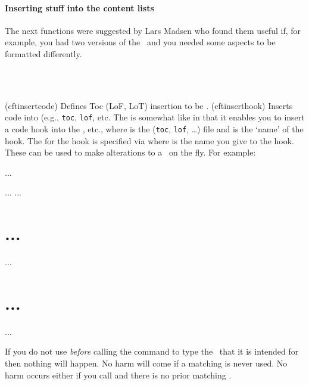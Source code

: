 \subsubsection{Inserting stuff into the content lists}
\label{sec:inserting-stuff-into}


The next functions were suggested by Lars Madsen who
found them useful if, for example, you had two versions of the
\toc\ and you needed some aspects to be formatted differently.
\begin{syntax}
\cmd{\cftinsertcode} \\
\cmd{\cftinserthook} \\
\end{syntax}
\glossary(cftinsertcode)
  {}%
  {Defines Toc (LoF, LoT)  insertion to be .}
\glossary(cftinserthook)
  {}%
  {Inserts code  into  (e.g., \texttt{toc}, \texttt{lof}, etc.}
The \cmd{\cftinserthook} is somewhat like \cmd{\addtocontents} in that it 
enables you to insert a code hook into the \toc, etc., where  is 
the (\texttt{toc}, \texttt{lof}, \ldots) file and  is the `name'
of the hook. The  for the hook is specified via \cmd{\cftinsertcode}
where  is the name you give to the hook. These can be used to make
alterations to a \listofx\ on the fly. For example:
\begin{lcode}
...
\frontmatter
\tableofcontents
{}%
\listoffigures
...
...
\chapter{...}
...
\mainmatter
{}
\chapter{...}
...
\end{lcode}
If you do not use \cmd{\cftinsertcode} \emph{before} calling the command to
type the \listofx\ that it is intended for then nothing will happen. No
harm will come if a matching \cmd{\cftinserthook} is never used. No harm
occurs either if you call \cmd{\cftinserthook} and there is no prior
matching \cmd{\cftinsertcode}.

